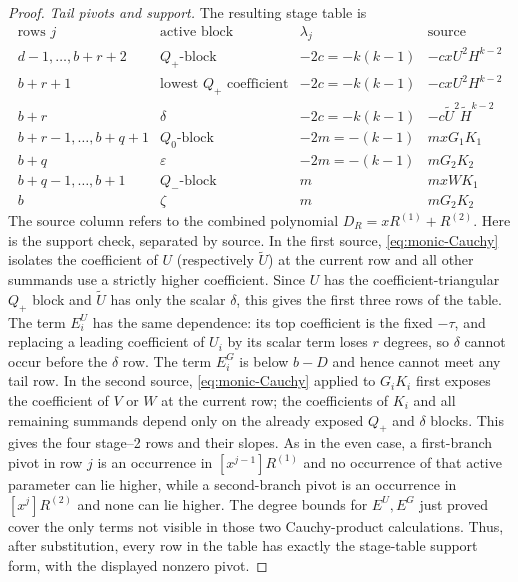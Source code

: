 \begin{proof}
      \smallskip\noindent\emph{Tail pivots and support.}
      The resulting stage table is
      \[
      \begin{array}{c|c|c|c}
        \text{rows }j&\text{active block}&\lambda_j&\text{source}\\ \hline
        d-1,\ldots,b+r+2&Q_+\text{-block}&-2c=-k(k-1)&-cxU^2H^{k-2}\\
        b+r+1&\text{lowest $Q_+$ coefficient}&-2c=-k(k-1)&-cxU^2H^{k-2}\\
        b+r&\delta&-2c=-k(k-1)&-c\widetilde U^2\widetilde H^{k-2}\\
        b+r-1,\ldots,b+q+1&Q_0\text{-block}&-2m=-(k-1)&mxG_1K_1\\
        b+q&\varepsilon&-2m=-(k-1)&mG_2K_2\\
        b+q-1,\ldots,b+1&Q_-\text{-block}&m&mxWK_1\\
        b&\zeta&m&mG_2K_2
      \end{array}
      \tag{R-odd-table}\label{eq:R-odd-table}
      \]
      The source column refers to the combined polynomial
      $D_R=xR^{(1)}+R^{(2)}$.  Here is the support check, separated by
      source.  In the first source, \eqref{eq:monic-Cauchy} isolates the coefficient of
      $U$ (respectively $\widetilde U$) at the current row and all other
      summands use a strictly higher coefficient.  Since $U$ has the
      coefficient-triangular $Q_+$ block and $\widetilde U$ has only the
      scalar $\delta$, this gives the first three rows of the table.  The
      term $E^U_i$ has the same dependence: its top coefficient is the fixed
      $-\tau$, and replacing a leading coefficient of $U_i$ by its scalar
      term loses $r$ degrees, so $\delta$ cannot occur before the $\delta$
      row.  The term $E^G_i$ is below $b-D$ and hence cannot meet any tail
      row.  In the second source, \eqref{eq:monic-Cauchy} applied to $G_iK_i$ first
      exposes the coefficient of $V$ or $W$ at the current row; the
      coefficients of $K_i$ and all remaining summands depend only on the
      already exposed $Q_+$ and $\delta$ blocks.  This gives the four
      stage--2 rows and their slopes.  As in the even case, a first-branch
      pivot in row $j$ is an occurrence in $[x^{j-1}]R^{(1)}$ and no occurrence
      of that active parameter can lie higher, while a second-branch pivot is
      an occurrence in $[x^j]R^{(2)}$ and none can lie higher.  The degree
      bounds for $E^U,E^G$ just proved cover the only terms not visible in
      those two Cauchy-product calculations.  Thus, after substitution, every
      row in the table has exactly the stage-table support form, with the
      displayed nonzero pivot.


\end{proof}
